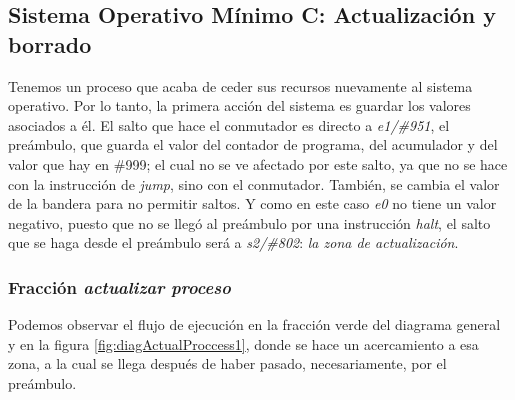 \documentclass[letterpaper,12pt,oneside]{book}
\begin{document}
		\clearpage		

        \subsection{Sistema Operativo Mínimo C: Actualización y borrado}
        
		
		
		Tenemos un proceso que acaba de ceder sus recursos nuevamente al sistema operativo. Por lo tanto, la primera acción del sistema es guardar los
		valores asociados a él. El salto que hace el conmutador es directo a \textit{e1/\#951}, el preámbulo, que guarda
		el valor del contador de programa, del acumulador y del valor que hay en \#999; el cual no se ve afectado por este salto, ya que no se hace
		con la instrucción de \textit{jump}, sino con el conmutador. También, se cambia el valor de la bandera
		para no permitir saltos. Y como en este caso
		\textit{e0} no tiene un valor negativo, puesto que no se llegó al preámbulo por una instrucción \textit{halt},
		el salto que se haga desde el preámbulo será a \textit{s2/\#802}: \textit{la zona de actualización}.
  
        \subsubsection{Fracción \textit{actualizar proceso}}
  
        Podemos observar
		el flujo de ejecución en la fracción verde del diagrama general y en la figura \ref{fig:diagActualProccess1}, donde se hace 
		un acercamiento a esa zona, a la cual se llega después de haber pasado, necesariamente, por el preámbulo.
		
\end{document}
